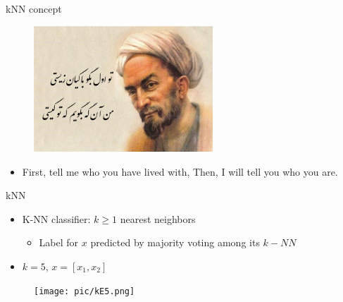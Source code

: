 \documentclass[serif, aspectratio=169]{beamer}
\begin{document}
\begin{frame}{kNN concept}
    \begin{figure}[h]
            \centering
            \includegraphics[width=0.6\textwidth]{pic/Saadi.png}
            \end{figure}
    \begin{itemize}
        \item First, tell me who you have lived with,
Then, I will tell you who you are.
    \end{itemize}
    
    
\end{frame}
\begin{frame}{kNN}
    \begin{minipage}{0.5\textwidth}
        \begin{itemize}
            \item K-NN classifier: $k \geq 1$ nearest neighbors
            \begin{itemize}
                \item Label for $x$ predicted by majority voting among its $k-NN$
            \end{itemize}
            \item $k=5$, $x=[x_1, x_2]$
        \end{itemize}
    \end{minipage} %
    \begin{minipage}{0.45\textwidth}
        \begin{figure}[h]
        \centering
        \texttt{[image: pic/kE5.png]}
        \end{figure}
        
        \vfill
    \end{minipage}
    
    
\end{frame}
\end{document}
